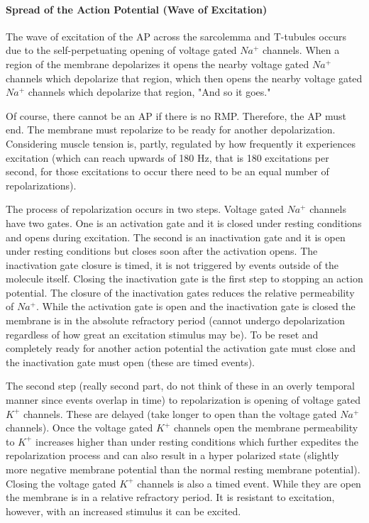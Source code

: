 \paragraph{Spread of the Action Potential (Wave of Excitation)}

The wave of excitation of the AP across the sarcolemma and T-tubules occurs due to the self-perpetuating opening of voltage gated $Na^+$ channels. When a region of the membrane depolarizes it opens the nearby voltage gated $Na^+$ channels which depolarize that region, which then opens the nearby voltage gated $Na^+$ channels which depolarize that region, "And so it goes."\footnotemark{}

Of course, there cannot be an AP if there is no RMP. Therefore, the AP must end. The membrane must repolarize to be ready for another depolarization. Considering muscle tension is, partly, regulated by how frequently it experiences excitation (which can reach upwards of 180 Hz, that is 180 excitations per second, for those excitations to occur there need to be an equal number of repolarizations).

The process of repolarization occurs in two steps. Voltage gated $Na^+$ channels have two gates. One is an activation gate and it is closed under resting conditions and opens during excitation. The second is an inactivation gate and it is open under resting conditions but closes soon after the activation opens. The inactivation gate closure is timed, it is not triggered by events outside of the molecule itself. Closing the inactivation gate is the first step to stopping an action potential. The closure of the inactivation gates reduces the relative permeability of $Na^+$. While the activation gate is open and the inactivation gate is closed the membrane is in the absolute refractory period (cannot undergo depolarization regardless of how great an excitation stimulus may be). To be reset and completely ready for another action potential the activation gate must close and the inactivation gate must open (these are timed events).

The second step (really second part, do not think of these in an overly temporal manner since events overlap in time) to repolarization is opening of voltage gated $K^+$ channels. These are delayed (take longer to open than the voltage gated $Na^+$ channels). Once the voltage gated $K^+$ channels open the membrane permeability to $K^+$ increases higher than under resting conditions which further expedites the repolarization process and can also result in a hyper polarized state (slightly more negative membrane potential than the normal resting membrane potential). Closing the voltage gated $K^+$ channels is also a timed event. While they are open the membrane is in a relative refractory period. It is resistant to excitation, however, with an increased stimulus it can be excited.

